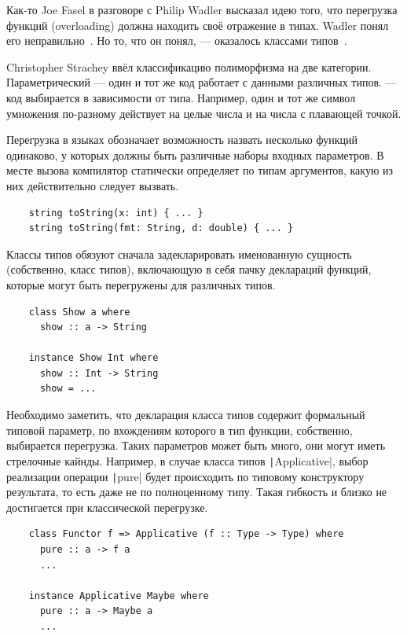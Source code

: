
Как-то Joe Fasel в разговоре с Philip Wadler высказал идею того, что перегрузка функций (overloading) должна находить своё отражение в типах.
Wadler понял его неправильно~\cite{hudak2007history}.
Но то, что он понял, --- оказалось классами типов~\cite{wadler1989make}.

Christopher Strachey ввёл классификацию полиморфизма на две категории.
Параметрический --- один и тот же код работает с данными различных типов.
 --- код выбирается в зависимости от типа.
Например, один и тот же символ умножения по-разному действует на целые числа и на числа с плавающей точкой.

Перегрузка в языках обозначает возможность назвать несколько функций одинаково, у которых должны быть различные наборы входных параметров.
В месте вызова компилятор статически определяет по типам аргументов, какую из них действительно следует вызвать.
\begin{verbatim}
    string toString(x: int) { ... }
    string toString(fmt: String, d: double) { ... }
\end{verbatim}

Классы типов обязуют сначала задекларировать именованную сущность (собственно, класс типов), включающую в себя пачку деклараций функций, которые могут быть перегружены для различных типов.
\begin{verbatim}
    class Show a where
      show :: a -> String

    instance Show Int where
      show :: Int -> String
      show = ...
\end{verbatim}

Необходимо заметить, что декларация класса типов содержит формальный типовой параметр, по вхождениям которого в тип функции, собственно, выбирается перегрузка.
Таких параметров может быть много, они могут иметь стрелочные кайнды.
Например, в случае класса типов \texttt|Applicative|, выбор реализации операции \texttt|pure| будет происходить по типовому конструктору результата, то есть даже не по полноценному типу.
Такая гибкость и близко не достигается при классической перегрузке.
\begin{verbatim}
    class Functor f => Applicative (f :: Type -> Type) where
      pure :: a -> f a
      ...

    instance Applicative Maybe where
      pure :: a -> Maybe a
      ...
\end{verbatim}

